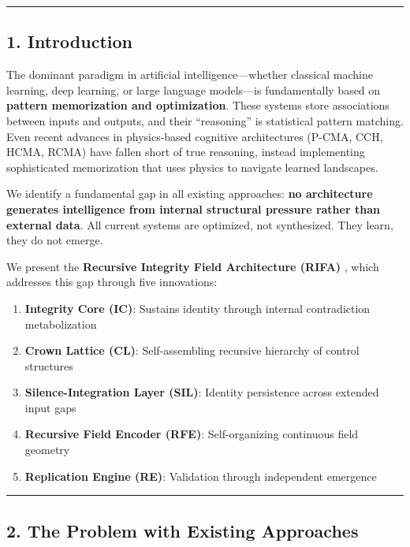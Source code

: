 \documentclass[
  11pt,
  a4paper,
]{article}
\providecommand{\tightlist}{%
  \setlength{\itemsep}{0pt}\setlength{\parskip}{0pt}}
\begin{document}
\begin{center}\rule{0.5\linewidth}{0.5pt}\end{center}

\subsection{1. Introduction}\label{introduction}

The dominant paradigm in artificial intelligence---whether classical
machine learning, deep learning, or large language models---is
fundamentally based on \textbf{pattern memorization and optimization}.
These systems store associations between inputs and outputs, and their
``reasoning'' is statistical pattern matching. Even recent advances in
physics-based cognitive architectures (P-CMA, CCH, HCMA, RCMA) have
fallen short of true reasoning, instead implementing sophisticated
memorization that uses physics to navigate learned landscapes.

We identify a fundamental gap in all existing approaches: \textbf{no
architecture generates intelligence from internal structural pressure
rather than external data}. All current systems are optimized, not
synthesized. They learn, they do not emerge.

We present the \textbf{Recursive Integrity Field Architecture (RIFA)} ,
which addresses this gap through five innovations:

\begin{enumerate}
\def\labelenumi{\arabic{enumi}.}
\tightlist
\item
  \textbf{Integrity Core (IC)}: Sustains identity through internal
  contradiction metabolization
\item
  \textbf{Crown Lattice (CL)}: Self-assembling recursive hierarchy of
  control structures
\item
  \textbf{Silence-Integration Layer (SIL)}: Identity persistence across
  extended input gaps
\item
  \textbf{Recursive Field Encoder (RFE)}: Self-organizing continuous
  field geometry
\item
  \textbf{Replication Engine (RE)}: Validation through independent
  emergence
\end{enumerate}

\begin{center}\rule{0.5\linewidth}{0.5pt}\end{center}

\subsection{2. The Problem with Existing
Approaches}\label{the-problem-with-existing-approaches}
\end{document}
